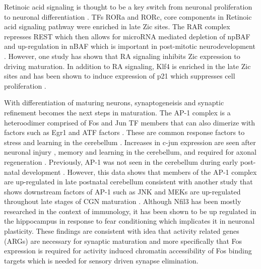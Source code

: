 \documentclass[fleqn,10pt]{wlscirep}
\begin{document}


Retinoic acid signaling is thought to be a key switch from neuronal proliferation to neuronal differentiation \cite{Janesick2015RetinoicDifferentiation}. TFs RORa and RORc, core components in Retinoic acid signaling pathway were enriched in late Zic sites. The RAR complex represses REST which then allows for microRNA mediated depletion of npBAF and up-regulation in nBAF which is important in post-mitotic neurodevelopment \cite{Alfert2019TheDisease}. However, one study has shown that RA signaling inhibits Zic expression \cite{Janesick2013ERFNeurogenesis} to driving maturation. In addition to RA signaling, Klf4 is enriched in the late Zic sites and has been shown to induce expression of p21 which suppresses cell proliferation \cite{Zhang2000ThePromoter}. 

With differentiation of maturing neurons, synaptogeneisis and synaptic refinement becomes the next steps in maturation. The AP-1 complex is a heteroodimer comprised of Fos and Jun TF members that can also dimerize with factors such as Egr1 and ATF factors \cite{Raivich2006RoleBrain}. These are common response factors to stress and learning in the cerebellum \cite{Nakamura2015ExpressionActivity, Coffey2000DualNeurons}. Increases in c-jun expression are seen after neuronal injury \cite{Liu2000TranstentorialMice}, memory and learning in the cerebellum, and required for axonal regeneration \cite{Raivich2004TheRegeneration, Raivich2006RoleBrain}. Previously, AP-1 was not seen in the cerebellum during early post-natal development \cite{Guerrini1997Glutamate-DependentDevelopment}. However, this data shows that members of the AP-1 complex are up-regulated in late postnatal cerebellum consistent with another study that shows downstream factors of AP-1 such as JNK and MEKs are up-regulated throughout late stages of CGN maturation \cite{Coffey2000DualNeurons}. Although Nfil3 has been mostly researched in the context of immunology, it has been shown to be up regulated in the hippocampus in response to fear conditioning \cite{Mizuno2020Long-lastingConditioning} which implicates it in neuronal plasticity. These findings are consistent with idea that activity related genes (ARGs) are necessary for synaptic maturation\cite{West2011NeuronalFunction} and more specifically that Fos expression is required for activity induced chromatin accessibility of Fos binding targets\cite{Su2017NeuronalBrain} which is needed for sensory driven synapse elimination. 
\end{document}
